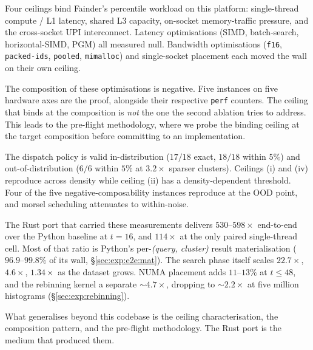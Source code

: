 Four ceilings bind Fainder's percentile workload on this platform: single-thread compute / L1 latency, shared L3 capacity, on-socket memory-traffic pressure, and the cross-socket UPI interconnect. Latency optimisations (SIMD, batch-search, horizontal-SIMD, PGM) all measured null. Bandwidth optimisations (\texttt{f16}, \texttt{packed-ids}, \texttt{pooled}, \texttt{mimalloc}) and single-socket placement each moved the wall on their own ceiling.

The composition of these optimisations is negative. Five instances on five hardware axes are the proof, alongside their respective \texttt{perf} counters. The ceiling that binds at the composition is \emph{not} the one the second ablation tries to address. This leads to the pre-flight methodology, where we probe the binding ceiling at the target composition before committing to an implementation.

The dispatch policy is valid in-distribution ($17/18$ exact, $18/18$ within $5\%$) and out-of-distribution ($6/6$ within $5\%$ at $3.2\times$ sparser clusters). Ceilings (i) and (iv) reproduce across density while ceiling (ii) has a density-dependent threshold. Four of the five negative-composability instances reproduce at the OOD point, and morsel scheduling attenuates to within-noise.

The Rust port that carried these measurements delivers $530$--$598\times$ end-to-end over the Python baseline at $t=16$, and $114\times$ at the only paired single-thread cell. Most of that ratio is Python's per-\emph{(query, cluster)} result materialisation ($96.9$--$99.8\%$ of its wall, §\ref{sec:exp:e2e:mat}). The search phase itself scales $22.7\times$, $4.6\times$, $1.34\times$ as the dataset grows. NUMA placement adds $11$--$13\%$ at $t \leq 48$, and the rebinning kernel a separate $\sim\!4.7\times$, dropping to $\sim\!2.2\times$ at five million histograms (§\ref{sec:exp:rebinning}).

What generalises beyond this codebase is the ceiling characterisation, the composition pattern, and the pre-flight methodology. The Rust port is the medium that produced them.